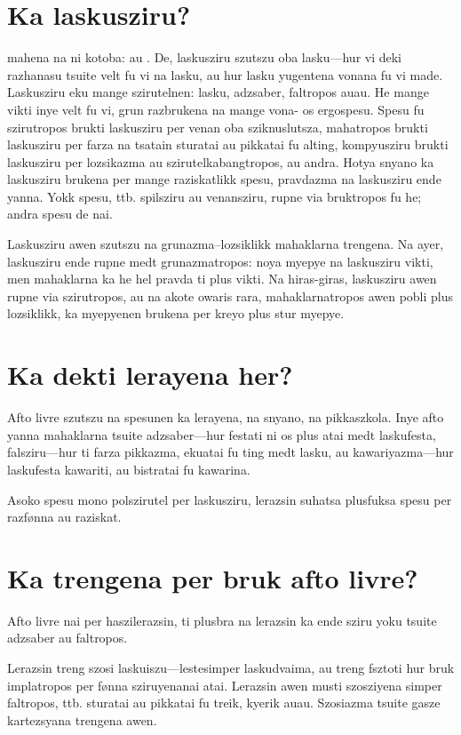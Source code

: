 \section{Ka laskusziru?}
 mahena na ni kotoba:  au . De, laskusziru
szutszu oba lasku---hur vi deki razhanasu tsuite velt fu vi na lasku,
au hur lasku yugentena vonana fu vi made. Laskusziru eku mange szirutelnen:
lasku, adzsaber, faltropos auau. He mange vikti inye velt fu vi, grun
razbrukena na mange vona- os ergospesu. Spesu fu szirutropos brukti laskusziru
per venan oba sziknuslutsza, mahatropos brukti laskusziru per farza na tsatain
sturatai au pikkatai fu alting, kompyusziru brukti laskusziru per lozsikazma au
szirutelkabangtropos, au andra. Hotya snyano ka laskusziru brukena per mange
raziskatlikk spesu, pravdazma na laskusziru ende yanna. Yokk spesu, ttb.
spilsziru au venansziru, rupne via bruktropos fu he; andra spesu de nai.

Laskusziru awen szutszu na grunazma--lozsiklikk mahaklarna trengena. Na ayer,
laskusziru ende rupne medt grunazmatropos: noya myepye na laskusziru vikti,
men mahaklarna ka he hel pravda ti plus vikti. Na hiras-giras, laskusziru
awen rupne via szirutropos, au na akote owaris rara, mahaklarnatropos awen
pobli plus lozsiklikk, ka myepyenen brukena per kreyo plus stur myepye.

\section{Ka dekti lerayena her?}
Afto livre szutszu na spesunen ka lerayena, na snyano, na pikkaszkola. Inye
afto yanna mahaklarna tsuite adzsaber---hur festati ni os plus atai medt
laskufesta, falsziru---hur ti farza pikkazma, ekuatai fu ting medt lasku,
au kawariyazma---hur laskufesta kawariti, au bistratai fu kawarina.

Asoko spesu mono polszirutel per laskusziru, lerazsin suhatsa plusfuksa
spesu per razfønna au raziskat.

\section{Ka trengena per bruk afto livre?}
Afto livre nai per haszilerazsin, ti plusbra na lerazsin ka ende sziru yoku
tsuite adzsaber au faltropos.

Lerazsin treng szosi laskuiszu---lestesimper laskudvaima, au treng fsztoti hur
bruk implatropos per fønna sziruyenanai atai. Lerazsin
awen musti szosziyena simper faltropos, ttb. sturatai au pikkatai
fu treik, kyerik auau. Szosiazma tsuite gasze kartezsyana trengena awen.


